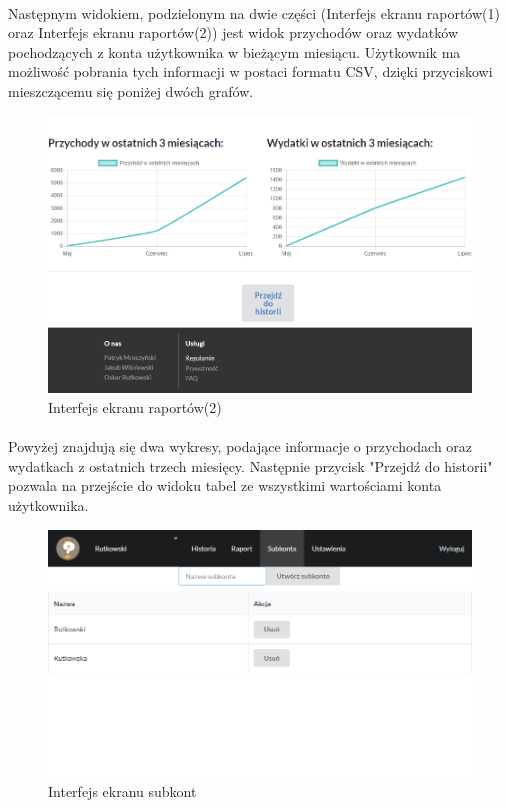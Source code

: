 \documentclass{article}
\begin{document}
\paragraph*{} Następnym widokiem, podzielonym na dwie części (Interfejs ekranu raportów(1) oraz Interfejs ekranu raportów(2)) jest widok przychodów oraz wydatków pochodzących z konta użytkownika w bieżącym miesiącu. Użytkownik ma możliwość pobrania tych informacji w postaci formatu CSV, dzięki przyciskowi mieszczącemu się poniżej dwóch grafów.  
\begin{figure}[H]
	\hspace*{0cm}
	\includegraphics[scale=0.5]{assets/view3(2).png}
	\caption[]{Interfejs ekranu raportów(2)}
	\label{fig:raport2}
\end{figure}
\paragraph*{} Powyżej znajdują się dwa wykresy, podające informacje o przychodach oraz wydatkach z ostatnich trzech miesięcy. Następnie przycisk "Przejdź do historii" pozwala na przejście do widoku tabel ze wszystkimi wartościami konta użytkownika.
\begin{figure}[H]
	\hspace*{0.5cm}
	\includegraphics[scale=0.5]{assets/view4.png}
	\caption[]{Interfejs ekranu subkont}
	\label{fig:subkonta}
\end{figure} 
\end{document}

